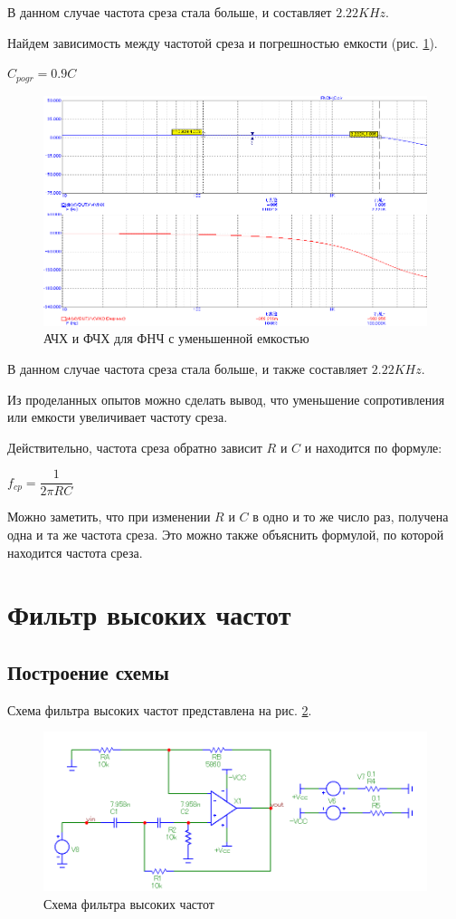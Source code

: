 \documentclass[a4paper,14pt]{article}
\begin{document}
В данном случае частота среза стала больше, и составляет $2.22KHz$.

Найдем зависимость между частотой среза и погрешностью емкости (рис. \ref{fig:pogrcn}). 

$C_{pogr} = 0.9C$

\begin{figure}[H]
	\centering
	\includegraphics[width=0.85\linewidth]{../imgs/FNCH/pogr_C_N}
	\caption{АЧХ и ФЧХ для ФНЧ с уменьшенной емкостью}
	\label{fig:pogrcn}
\end{figure}

В данном случае частота среза стала больше, и также составляет $2.22KHz$.

Из проделанных опытов можно сделать вывод, что уменьшение сопротивления или емкости увеличивает частоту среза.

Действительно, частота среза обратно зависит $R$ и $C$ и находится по формуле:

$f_{cp} = \dfrac{1}{2\pi RC}$

Можно заметить, что при изменении $R$ и $C$ в одно и то же число раз, получена одна и та же частота среза.
Это можно также объяснить формулой, по которой находится частота среза.

\section{Фильтр высоких частот}

\subsection{Построение схемы}

Схема фильтра высоких частот представлена на рис. \ref{fig:shfvch}.


\begin{figure}[H]
	\centering
	\includegraphics[width=0.85\linewidth]{../imgs/FVCH/sh_fvch}
	\caption{Схема фильтра высоких частот}
	\label{fig:shfvch}
\end{figure}
\end{document}
